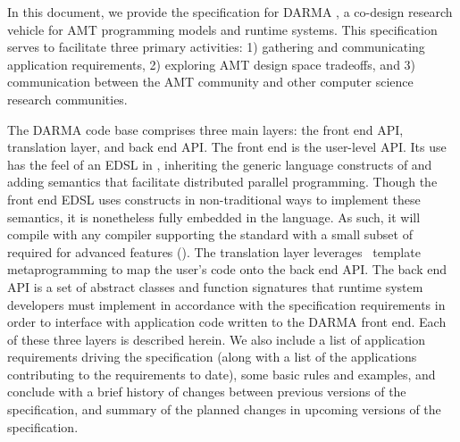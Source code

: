 
In this document, we provide the specification for DARMA 
,
a co-design research vehicle for \gls{AMT} programming models and runtime
systems.  This specification serves to facilitate three primary activities: 
1) gathering and communicating application requirements, 2) exploring AMT
design space tradeoffs, and 3) communication between the AMT community and
other computer science research communities.

The DARMA code base comprises three main layers: the \gls{front end} \gls{API},
\gls{translation layer}, and \gls{back end} \gls{API}.  
The \gls{front end} is the user-level \gls{API}. 
Its use has the feel of an \gls{EDSL} in \CC,  inheriting the generic
language constructs of \CC and adding \gls{semantics} that facilitate
distributed parallel programming. Though the \gls{front end} \gls{EDSL} uses
\CC constructs in non-traditional ways to implement these semantics, it is
nonetheless fully embedded in the \CC language. As such, it will compile with any
\CC compiler supporting the  standard with a small subset of 
required for advanced features ().
The \gls{translation layer} leverages \CC\ \gls{template
metaprogramming} to map the user's code onto the \gls{back end} \gls{API}.
The \gls{back end} \gls{API} is a set of abstract classes and function
signatures that runtime system developers must implement in accordance with the
specification requirements in order to interface with application code written
to the DARMA front end.  
Each of these three layers is described herein. We also
include a list of application requirements driving the specification (along
with a list of the applications contributing to the requirements to date), some basic rules 
and examples, and conclude with a brief history of changes between previous
versions of the specification, and summary of the planned changes in upcoming
versions of the specification.
